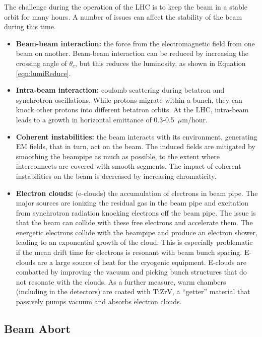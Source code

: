 The challenge during the operation of the LHC is to keep the beam in a stable orbit for many hours.
A number of issues can affect the stability of the beam during this time. \cite{lyndon}
\begin{itemize}
    \item \textbf{Beam-beam interaction:} the force from the electromagnetic field from one beam on another. Beam-beam interaction can be reduced by increasing the crossing angle of $\theta_c$, but this reduces the luminosity, as shown in Equation \ref{eqn:lumiReduce}.
    \item \textbf{Intra-beam interaction:} coulomb scattering during betatron and synchrotron oscillations. While protons migrate within a bunch, they can knock other protons into different betatron orbits. At the LHC, intra-beam leads to a growth in horizontal emittance of 0.3-0.5~$\mu$m/hour.
    \item \textbf{Coherent instabilities:} the beam interacts with its environment, generating EM fields, that in turn, act on the beam. The induced fields are mitigated by smoothing the beampipe as much as possible, to the extent where interconnects are covered with smooth segments. The impact of coherent instabilities on the beam is decreased by increasing chromaticity.
    \item \textbf{Electron clouds:} (e-clouds) the accumulation of electrons in beam pipe. The major sources are ionizing the residual gas in the beam pipe and excitation from synchrotron radiation knocking electrons off the beam pipe. The issue is that the beam can collide with these free electrons and accelerate them. The energetic electrons collide with the beampipe and produce an electron shower, leading to an exponential growth of the cloud. This is especially problematic if the mean drift time for electrons is resonant with beam bunch spacing. E-clouds are a large source of heat for the cryogenic equipment. E-clouds are combatted by improving the vacuum and picking bunch structures that do not resonate with the clouds. As a further measure, warm chambers (including in the detectors) are coated with TiZrV, a ``getter'' material that passively pumps vacuum and absorbs electron clouds.
\end{itemize}


\subsection{Beam Abort}

